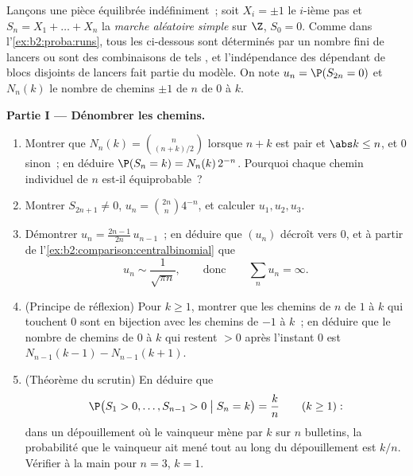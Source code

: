 \begin{problem}\label{pb:b2:proba:1}
Lançons une pièce équilibrée indéfiniment~; soit $X_i = \pm1$ le $i$-ième pas
et $S_n = X_1 + \dots + X_n$ la \emph{marche aléatoire
simple} sur $\Z$, $S_0 = 0$. Comme dans
l'\cref{ex:b2:proba:runs}, tous les  ci-dessous sont déterminés par
un nombre fini de lancers ou sont des combinaisons  de tels
, et l'indépendance des  dépendant de blocs disjoints
de lancers fait partie du modèle. On note $u_n =
\P(S_{2n} = 0)$ et $N_n(k)$ le nombre de chemins $\pm1$ de
 $n$ de $0$ à $k$.

\medskip
\noindent\textbf{Partie I --- Dénombrer les chemins.}
\begin{enumerate}
  \item Montrer que $N_n(k) = \binom{n}{(n+k)/2}$ lorsque $n + k$
        est pair et $\abs k \leq n$, et $0$ sinon~; en déduire
        $\P(S_n = k) = N_n(k)\,2^{-n}$. Pourquoi chaque
        chemin individuel de  $n$ est-il équiprobable~?
  \item Montrer $S_{2n+1} \neq 0$, $u_n =
        \binom{2n}{n}4^{-n}$, et calculer $u_1, u_2, u_3$.
  \item Démontrer $u_n = \frac{2n-1}{2n}\,u_{n-1}$~; en déduire que
        $(u_n)$ décroît vers $0$, et à partir de
        l'\cref{ex:b2:comparison:centralbinomial} que
        \[
        u_n \sim \frac{1}{\sqrt{\pi n}},
        \qquad\text{donc}\qquad
        \sum_n u_n = \infty .
        \]
  \item (Principe de réflexion) Pour $k \geq 1$, montrer que les
        chemins de  $n$ de $1$ à $k$ qui touchent $0$
        sont en bijection avec les chemins de $-1$ à $k$~;
        en déduire que le nombre de chemins de $0$ à $k$ qui
        restent $> 0$ après l'instant $0$ est $N_{n-1}(k-1) -
        N_{n-1}(k+1)$.
  \item (Théorème du scrutin) En déduire que
        \[
        \P\bigl(S_1 > 0, \dots, S_{n-1} > 0 \bigm| S_n =
        k\bigr) = \frac kn \qquad (k \geq 1) :
        \]
        dans un dépouillement où le vainqueur mène par $k$ sur $n$
        bulletins, la probabilité que le vainqueur ait mené tout au long
        du dépouillement est $k/n$. Vérifier à la main pour $n = 3$, $k =
        1$.
\end{enumerate}


\end{problem}
